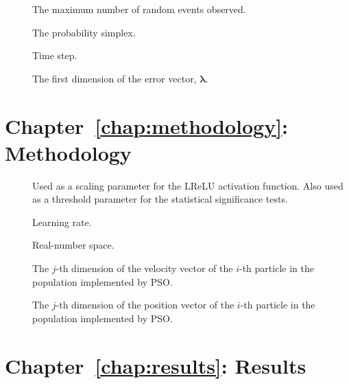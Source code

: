 \begin{description}
	\item [\parbox{2cm}{$N$}] \parbox{12.5cm}{The maximum number of random events observed.}
	\item [\parbox{2cm}{$S$}] \parbox{12.5cm}{The probability simplex.}
	\item [\parbox{2cm}{$t$}] \parbox{12.5cm}{Time step.}
	\item [\parbox{2cm}{$\lambda_{1}$}] \parbox{12.5cm}{The first dimension of the error vector, $\boldsymbol{\lambda}$.}
\end{description}

\section{Chapter~\ref{chap:methodology}: Methodology}
\label{sec:symbols:methodology}

\begin{description}
	\item [\parbox{2cm}{$\alpha$}] \parbox{12.5cm}{Used as a scaling parameter for the \acs{LReLU} activation function. Also used as a threshold parameter for the statistical significance tests.}
	\item [\parbox{2cm}{$\eta$}] \parbox{12.5cm}{Learning rate.}
	\item [\parbox{2cm}{$\mathbb{R}$}] \parbox{12.5cm}{Real-number space.}
	\item [\parbox{2cm}{$v_{ij}$}] \parbox{12.5cm}{The $j$-th dimension of the velocity vector of the $i$-th particle in the population implemented by \acs{PSO}.}
	\item [\parbox{2cm}{$x_{ij}$}] \parbox{12.5cm}{The $j$-th dimension of the position vector of the $i$-th particle in the population implemented by \acs{PSO}.}
\end{description}

\section{Chapter~\ref{chap:results}: Results}
\label{sec:symbols:results}

